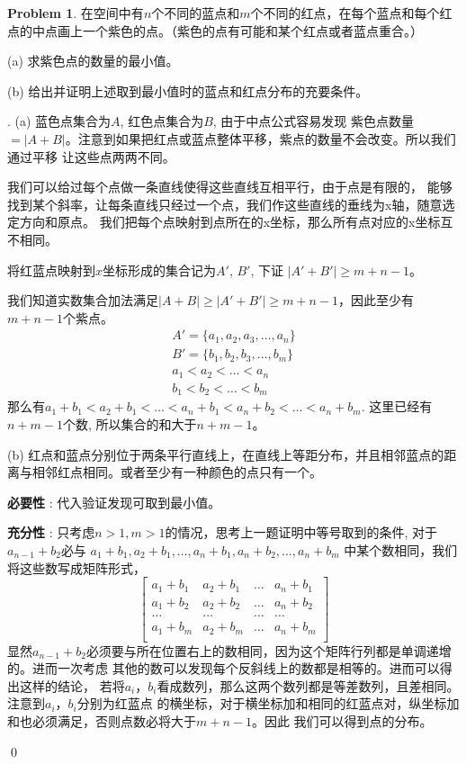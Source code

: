 \documentclass[UTF8]{ctexart}
\newenvironment{sol}
  {\par\vspace{3mm}\noindent{\it Solution}.}
  {\qed \\ \medskip}
\theoremstyle{definition}
\newtheorem{problem}{Problem}
\begin{document}
\begin{problem}
在空间中有$n$个不同的蓝点和$m$个不同的红点，在每个蓝点和每个红点的中点画上一个紫色的点。（紫色的点有可能和某个红点或者蓝点重合。）

(a) 求紫色点的数量的最小值。

(b) 给出并证明上述取到最小值时的蓝点和红点分布的充要条件。
\begin{sol}
  (a) 蓝色点集合为$A$, 红色点集合为$B$, 由于中点公式容易发现
  紫色点数量$=|A+B|$。注意到如果把红点或蓝点整体平移，紫点的数量不会改变。所以我们通过平移
  让这些点两两不同。
  
  我们可以给过每个点做一条直线使得这些直线互相平行，由于点是有限的，
  能够找到某个斜率，让每条直线只经过一个点，我们作这些直线的垂线为x轴，随意选定方向和原点。
  我们把每个点映射到点所在的x坐标，那么所有点对应的x坐标互不相同。
  
  将红蓝点映射到$x$坐标形成的集合记为$A'$, $B'$, 下证 $|A'+B'|\geq m+n-1$。
  
  
  我们知道实数集合加法满足$|A+B|\geq|A'+B'|\geq m+n-1$，因此至少有$m+n-1$个紫点。
  $$
  \begin{aligned}
    A' = \{a_1, a_2, a_3, \dots, a_n\} \\
    B' = \{b_1, b_2, b_3, \dots, b_m\} \\
    a_1 < a_2 < \dots < a_n \\
    b_1 < b_2 < \dots < b_m
  \end{aligned}
  $$
  那么有$a_1 + b_1 < a_2 + b_1 < \dots < a_n + b_1 < a_n + b_2 < \dots < a_n + b_m$.
  这里已经有$n+m-1$个数, 所以集合的和大于$n+m-1$。

  (b) 红点和蓝点分别位于两条平行直线上，在直线上等距分布，并且相邻蓝点的距离与相邻红点相同。或者至少有一种颜色的点只有一个。
  
  \textbf{必要性} : 代入验证发现可取到最小值。

  \textbf{充分性} :
  只考虑$n>1,m>1$的情况，思考上一题证明中等号取到的条件, 对于$a_{n-1}+b_2$必与
  $a_1 + b_1 , a_2 + b_1 , \dots , a_n + b_1 , a_n + b_2 , \dots , a_n + b_m$
  中某个数相同，我们将这些数写成矩阵形式，
  $$
  \begin{bmatrix}
    a_1 + b_1 & a_2 + b_1 & \dots & a_n + b_1 \\
    a_1 + b_2 & a_2 + b_2 & \dots & a_n + b_2 \\
    \dots     &     \dots & \dots & \dots     \\
    a_1 + b_m & a_2 + b_m & \dots & a_n + b_m \\
  \end{bmatrix}
  $$
  显然$a_{n-1}+b_2$必须要与所在位置右上的数相同，因为这个矩阵行列都是单调递增的。进而一次考虑
  其他的数可以发现每个反斜线上的数都是相等的。进而可以得出这样的结论，
  若将$a_i$，$b_i$看成数列，那么这两个数列都是等差数列，且差相同。注意到$a_i$，$b_i$分别为红蓝点
  的横坐标，对于横坐标加和相同的红蓝点对，纵坐标加和也必须满足，否则点数必将大于$m+n-1$。因此
  我们可以得到点的分布。

  
\end{sol}
\end{problem}
\end{document}

